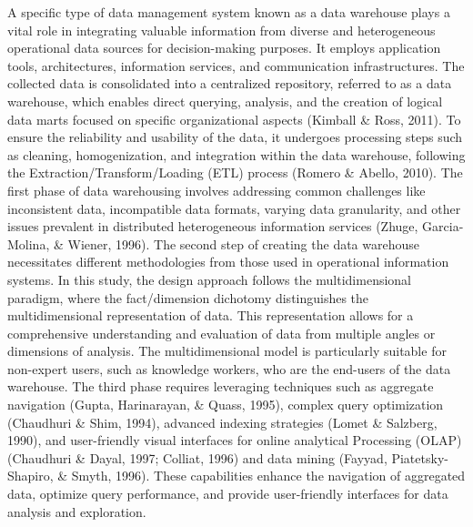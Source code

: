 \documentclass[12pt,twoside]{reedthesis}
\begin{document}
A specific type of data management system known as a data warehouse plays a vital role in integrating valuable information from diverse and heterogeneous operational data sources for decision-making purposes. It employs application tools, architectures, information services, and communication infrastructures. The collected data is consolidated into a centralized repository, referred to as a data warehouse, which enables direct querying, analysis, and the creation of logical data marts focused on specific organizational aspects (Kimball \& Ross, 2011). To ensure the reliability and usability of the data, it undergoes processing steps such as cleaning, homogenization, and integration within the data warehouse, following the Extraction/Transform/Loading (ETL) process (Romero \& Abello, 2010). The first phase of data warehousing involves addressing common challenges like inconsistent data, incompatible data formats, varying data granularity, and other issues prevalent in distributed heterogeneous information services (Zhuge, Garcia-Molina, \& Wiener, 1996). The second step of creating the data warehouse necessitates different methodologies from those used in operational information systems. In this study, the design approach follows the multidimensional paradigm, where the fact/dimension dichotomy distinguishes the multidimensional representation of data. This representation allows for a comprehensive understanding and evaluation of data from multiple angles or dimensions of analysis. The multidimensional model is particularly suitable for non-expert users, such as knowledge workers, who are the end-users of the data warehouse. The third phase requires leveraging techniques such as aggregate navigation (Gupta, Harinarayan, \& Quass, 1995), complex query optimization (Chaudhuri \& Shim, 1994), advanced indexing strategies (Lomet \& Salzberg, 1990), and user-friendly visual interfaces for online analytical Processing (OLAP) (Chaudhuri \& Dayal, 1997; Colliat, 1996) and data mining (Fayyad, Piatetsky-Shapiro, \& Smyth, 1996). These capabilities enhance the navigation of aggregated data, optimize query performance, and provide user-friendly interfaces for data analysis and exploration.
\end{document}
